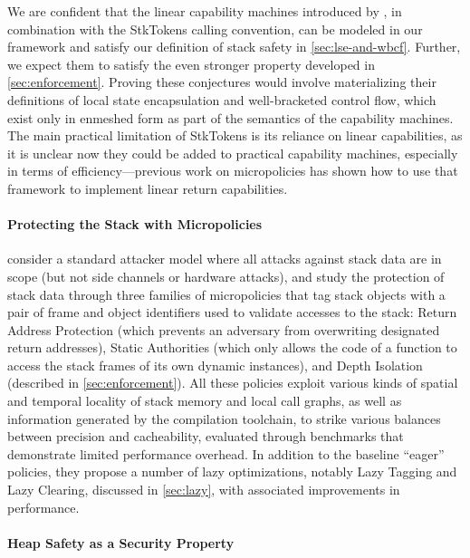 \documentclass[acmsmall,review,anonymous]{acmart}\settopmatter{printfolios=true,printccs=false,printacmref=false}
\begin{document}
{We are confident that the linear capability machines introduced by
\citep{Skorstengaard+19}, in combination with the StkTokens calling convention,
can be modeled in our framework and satisfy our definition of stack safety in
\cref{sec:lse-and-wbcf}. Further, we expect them to satisfy the even stronger
property developed in \cref{sec:enforcement}. Proving these conjectures would
involve materializing their definitions of local state encapsulation and
well-bracketed control flow, which exist only in enmeshed form as part of the
semantics of the capability machines. The main practical limitation of StkTokens
is its reliance on linear capabilities, as it is unclear now they could be added
to practical capability machines, especially in terms of efficiency---previous
work on micropolicies \citep{yannis-report} has shown how to use that framework
to implement linear return capabilities.

\paragraph{Protecting the Stack with Micropolicies}
%
\citet{DBLP:conf/sp/RoesslerD18} consider a standard attacker model where all
attacks against stack data are in scope (but not side channels or hardware
attacks), and study the protection of stack data through three families of
micropolicies that tag stack objects with a pair of frame and object identifiers
used to validate accesses to the stack: Return Address Protection (which
prevents an adversary from overwriting designated return addresses), Static
Authorities (which only allows the code of a function to access the stack frames
of its own dynamic instances), and Depth Isolation (described in
\cref{sec:enforcement}). All these policies exploit various kinds of spatial and
temporal locality of stack memory and local call graphs, as well as information
generated by the compilation toolchain, to strike various balances between
precision and cacheability, evaluated through benchmarks that demonstrate
limited performance overhead. In addition to the baseline ``eager'' policies,
they propose a number of lazy optimizations, notably Lazy Tagging and Lazy
Clearing, discussed in \cref{sec:lazy}, with associated improvements in
performance.

\paragraph{Heap Safety as a Security Property}

}
\end{document}

